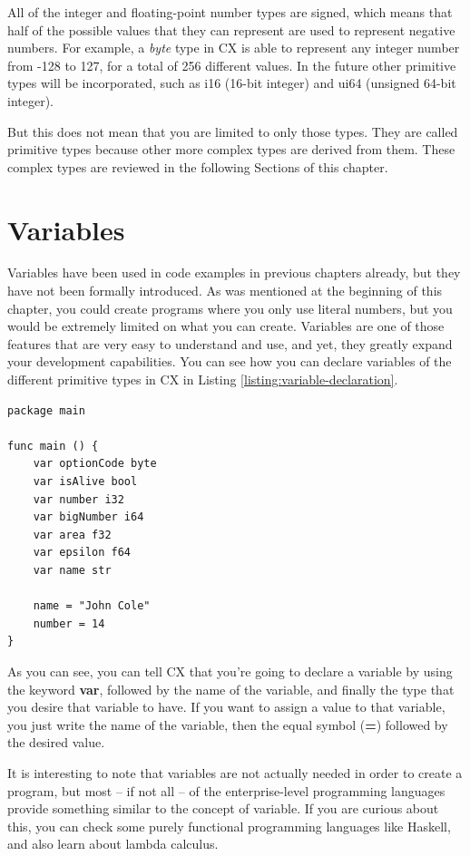 \documentclass[11pt,fleqn,openany]{book} %
\begin{document}
All of the integer and floating-point number types are signed, which means that half of the possible values that they can represent are used to represent negative numbers. For example, a \textit{byte} type in CX is able to represent any integer number from -128 to 127, for a total of 256 different values. In the future other primitive types will be incorporated, such as i16 (16-bit integer) and ui64 (unsigned 64-bit integer).

But this does not mean that you are limited to only those types. They are called primitive types because other more complex types are derived from them. These complex types are reviewed in the following Sections of this chapter.

\section{Variables}

Variables have been used in code examples in previous chapters already, but they have not been formally introduced. As was mentioned at the beginning of this chapter, you could create programs where you only use literal numbers, but you would be extremely limited on what you can create. Variables are one of those features that are very easy to understand and use, and yet, they greatly expand your development capabilities. You can see how you can declare variables of the different primitive types in CX in Listing \ref{listing:variable-declaration}.

\begin{lstlisting}[caption={Variable declaration},captionpos=b,label={listing:variable-declaration}]
package main

func main () {
	var optionCode byte
	var isAlive bool
	var number i32
	var bigNumber i64
	var area f32
	var epsilon f64
	var name str
    
    name = "John Cole"
    number = 14
}
\end{lstlisting}

As you can see, you can tell CX that you're going to declare a variable by using the keyword \textbf{var}, followed by the name of the variable, and finally the type that you desire that variable to have. If you want to assign a value to that variable, you just write the name of the variable, then the equal symbol (\textbf{=}) followed by the desired value.

It is interesting to note that variables are not actually needed in order to create a program, but most -- if not all -- of the enterprise-level programming languages provide something similar to the concept of variable. If you are curious about this, you can check some purely functional programming languages like Haskell, and also learn about lambda calculus.
\end{document}

